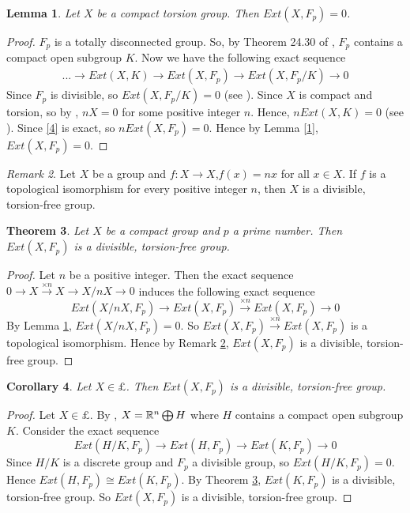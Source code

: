 \documentclass{amsart}
\newtheorem{thm}{Theorem}[section]
\newtheorem{cor}[thm]{Corollary}
\newtheorem{lem}[thm]{Lemma}
\theoremstyle{definition}
\theoremstyle{remark}
\newtheorem{rem}[thm]{Remark}
\numberwithin{equation}{section}
\begin{document}
\begin{lem}\label{3}
Let $X$ be a compact torsion group. Then $Ext(X,F_{p})=0$.
\end{lem}
\begin{proof}
$F_{p}$ is a totally disconnected group. So, by Theorem 24.30 of \cite{HR}, $F_{p}$ contains a compact open subgroup $K$. Now we have the following exact sequence
\begin{eqnarray}\label{4}
...\to Ext(X,K)\to Ext(X,F_{p})\to Ext(X,F_{p}/K)\to 0
\end{eqnarray}
Since $F_{p}$ is divisible, so $Ext(X,F_{p}/K)=0$ (see \cite[Theorem 3.4]{FG1}). Since $X$ is compact and  torsion, so by \cite[Theorem 25.9]{HR}, $nX=0$ for some positive integer $n$. Hence, $nExt(X,K)=0$ (see \cite[Lemma 2.5]{L}). Since \eqref{4} is exact, so $nExt(X,F_{p})=0$. Hence by Lemma \ref{1}, $Ext(X,F_{p})=0$.
\end{proof}
\begin{rem}\label{5}
Let $X$ be a group and $f:X\to X$,$f(x)=nx$ for all $x\in X$. If $f$ is a topological isomorphism for every positive integer $n$, then $X$ is a divisible, torsion-free group.
\end{rem}
\begin{thm}\label{6}
Let $X$ be a compact group and $p$ a prime number. Then $Ext(X,F_{p})$ is a divisible, torsion-free group.
\end{thm}
\begin{proof}
Let $n$ be a positive integer. Then the exact sequence $0\to X\stackrel{\times n}{\to} X\stackrel{}{\to} X/nX\to 0$ induces the following exact sequence $$Ext(X/nX,F_{p})\to Ext(X,F_{p})\stackrel{\times n}\to Ext(X,F_{p})\to 0$$ By Lemma \ref{3}, $Ext(X/nX,F_{p})=0$. So $Ext(X,F_{p})\stackrel{\times n}\to Ext(X,F_{p})$ is a topological isomorphism. Hence by Remark \ref{5}, $Ext(X,F_{p})$ is a divisible, torsion-free group.
\end{proof}
\begin{cor}
Let $X\in \pounds$. Then $Ext(X,F_{p})$ is a divisible, torsion-free group.
\end{cor}
\begin{proof}
Let $X\in \pounds$. By \cite[Theorem 24.30]{HR}, $X=\Bbb R^{n}\bigoplus H$ where $H$ contains a compact open subgroup $K$. Consider the exact sequence $$Ext(H/K,F_{p})\to Ext(H,F_{p})\to Ext(K,F_{p})\to 0$$ Since $H/K$ is a discrete group and $F_{p}$ a divisible group, so $Ext(H/K,F_{p})=0$. Hence $Ext(H,F_{p})\cong Ext(K,F_{p})$. By Theorem \ref{6}, $Ext(K,F_{p})$ is a divisible, torsion-free group. So $Ext(X,F_{p})$ is a divisible, torsion-free group.
\end{proof}
\end{document}
